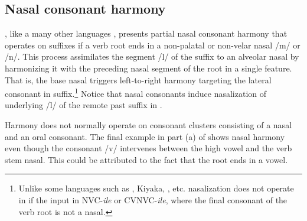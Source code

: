 \documentclass[output=paper]{langsci/langscibook}
\begin{document}
\subsection{Nasal consonant harmony}

 
, like a many other  languages \citep{greenberg1951}, presents partial nasal consonant harmony that operates on suffixes if a verb root ends in a non-palatal or non-velar nasal /m/ or /n/. This process assimilates the segment /l/ of the suffix to an alveolar nasal by harmonizing it with the preceding nasal segment of the root in a single feature. That is, the base nasal triggers left-to-right harmony targeting the lateral consonant in suffix.\footnote{Unlike some  languages such as , Kiyaka, , etc. nasalization does not operate in  if the input in NVC-\textit{ile} or CVNVC-\textit{ile}, where the final consonant of the verb root is not a nasal.} Notice that nasal consonants induce nasalization of underlying /l/ of the remote past suffix in . 
 

 
Harmony does not normally operate on consonant clusters consisting of a nasal and an oral consonant. The final example in part (a) of  shows nasal harmony even though the consonant /v/ intervenes between the high vowel and the verb stem nasal. This could be attributed to the fact that the root ends in a vowel. 
\end{document}
